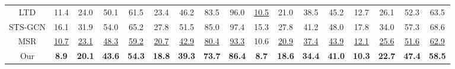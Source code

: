 \begin{table}[t]
{\begin{tabular}{c|cccc|cccc|cccc|cccc}
    LTD         & 11.4         & 24.0          & 50.1          & 61.5          & 23.4          & 46.2          & 83.5          & 96.0          & \underline{10.5}   & 21.0          & 38.5          & 45.2          & 12.7          & 26.1          & 52.3          & 63.5          \\
    STS-GCN      & 16.1         & 31.9          & 54.0          & 65.2          & 27.8          & 51.5          & 85.0          & 97.4          & 15.3         & 27.8          & 41.2          & 48.0          & 17.8          & 34.0          & 57.3          & 68.6          \\
    MSR         & \underline{10.7}   & \underline{23.1}    & \underline{48.3}    & \underline{59.2}    & \underline{20.7}    & \underline{42.9}    & \underline{80.4}    & \underline{93.3}    & 10.6         & \underline{20.9}    & \underline{37.4}    & \underline{43.9}    & \underline{12.1}    & \underline{25.6}    & \underline{51.6}    & \underline{62.9}    \\
    Our         & \textbf{8.9} & \textbf{20.1} & \textbf{43.6} & \textbf{54.3} & \textbf{18.8} & \textbf{39.3} & \textbf{73.7} & \textbf{86.4} & \textbf{8.7} & \textbf{18.6} & \textbf{34.4} & \textbf{41.0} & \textbf{10.3} & \textbf{22.7} & \textbf{47.4} & \textbf{58.5} \\ \hline
    \end{tabular}
    }
    \label{table:Human3.6M_short-term}
    \end{table}




